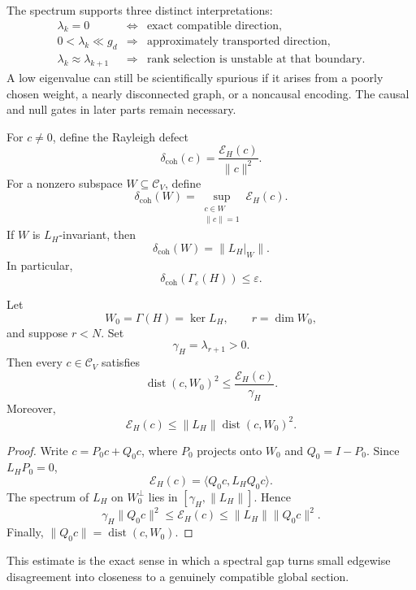The spectrum supports three distinct interpretations:
\[
\begin{array}{rcl}
\lambda_k=0
&\Longleftrightarrow&
\text{exact compatible direction},\\
0<\lambda_k\ll g_d
&\Longrightarrow&
\text{approximately transported direction},\\
\lambda_k\approx\lambda_{k+1}
&\Longrightarrow&
\text{rank selection is unstable at that boundary}.
\end{array}
\]
A low eigenvalue can still be scientifically spurious if it arises from a
poorly chosen weight, a nearly disconnected graph, or a noncausal encoding.
The causal and null gates in later parts remain necessary.


For \(c\neq0\), define the Rayleigh defect
\[
\delta_{\mathrm{coh}}(c)
=
\frac{\mathcal E_H(c)}{\|c\|^2}.
\]
For a nonzero subspace \(W\subseteq\mathcal C_V\), define
\[
\delta_{\mathrm{coh}}(W)
=
\sup_{\substack{c\in W\\\|c\|=1}}
\mathcal E_H(c).
\]
If \(W\) is \(L_H\)-invariant, then
\[
\delta_{\mathrm{coh}}(W)
=
\|L_H|_W\|.
\]
In particular,
\[
\delta_{\mathrm{coh}}(\Gamma_\varepsilon(H))
\leq\varepsilon.
\]

\begin{theorem}\label{thm:poincare-workspace}
Let
\[
W_0=\Gamma(H)=\ker L_H,
\qquad
r=\dim W_0,
\]
and suppose \(r<N\). Set
\[
\gamma_H=\lambda_{r+1}>0.
\]
Then every \(c\in\mathcal C_V\) satisfies
\[
\boxed{
\operatorname{dist}(c,W_0)^2
\leq
\frac{\mathcal E_H(c)}{\gamma_H}.
}
\]
Moreover,
\[
\mathcal E_H(c)
\leq
\|L_H\|\operatorname{dist}(c,W_0)^2.
\]
\end{theorem}

\begin{proof}
Write \(c=P_0c+Q_0c\), where \(P_0\) projects onto \(W_0\) and
\(Q_0=I-P_0\). Since \(L_HP_0=0\),
\[
\mathcal E_H(c)
=
\langle Q_0c,L_HQ_0c\rangle.
\]
The spectrum of \(L_H\) on \(W_0^\perp\) lies in
\([\gamma_H,\|L_H\|]\). Hence
\[
\gamma_H\|Q_0c\|^2
\leq
\mathcal E_H(c)
\leq
\|L_H\|\|Q_0c\|^2.
\]
Finally, \(\|Q_0c\|=\operatorname{dist}(c,W_0)\).
\end{proof}

This estimate is the exact sense in which a spectral gap turns small edgewise
disagreement into closeness to a genuinely compatible global section.


